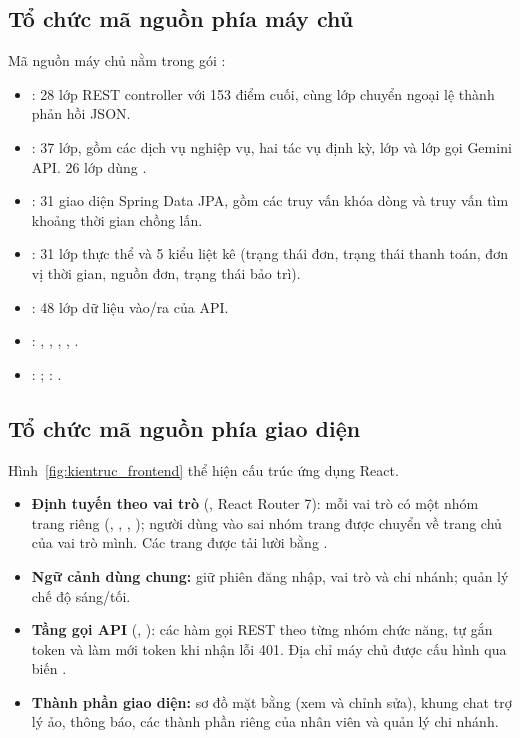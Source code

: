 \subsection{Tổ chức mã nguồn phía máy chủ}
\label{ssec:phantang_be}
Mã nguồn máy chủ nằm trong gói :
\begin{itemize}
    \item {}: 28 lớp REST controller với 153 điểm cuối, cùng lớp  chuyển ngoại lệ thành phản hồi JSON.
    \item {}: 37 lớp, gồm các dịch vụ nghiệp vụ, hai tác vụ định kỳ, lớp  và lớp  gọi Gemini API. 26 lớp dùng .
    \item {}: 31 giao diện Spring Data JPA, gồm các truy vấn khóa dòng  và truy vấn tìm khoảng thời gian chồng lấn.
    \item {}: 31 lớp thực thể và 5 kiểu liệt kê (trạng thái đơn, trạng thái thanh toán, đơn vị thời gian, nguồn đơn, trạng thái bảo trì).
    \item {}: 48 lớp dữ liệu vào/ra của API.
    \item {}: , , , , .
    \item {}: ; : .
\end{itemize}

\subsection{Tổ chức mã nguồn phía giao diện}
\label{ssec:phantang_fe}
Hình~\ref{fig:kientruc_frontend} thể hiện cấu trúc ứng dụng React.


\begin{itemize}
    \item \textbf{Định tuyến theo vai trò} (, React Router 7): mỗi vai trò có một nhóm trang riêng (, , , ); người dùng vào sai nhóm trang được chuyển về trang chủ của vai trò mình. Các trang được tải lười bằng .
    \item \textbf{Ngữ cảnh dùng chung:}  giữ phiên đăng nhập, vai trò và chi nhánh;  quản lý chế độ sáng/tối.
    \item \textbf{Tầng gọi API} (, ): các hàm gọi REST theo từng nhóm chức năng, tự gắn token và làm mới token khi nhận lỗi 401. Địa chỉ máy chủ được cấu hình qua biến .
    \item \textbf{Thành phần giao diện:} sơ đồ mặt bằng (xem và chỉnh sửa), khung chat trợ lý ảo, thông báo, các thành phần riêng của nhân viên và quản lý chi nhánh.
\end{itemize}

